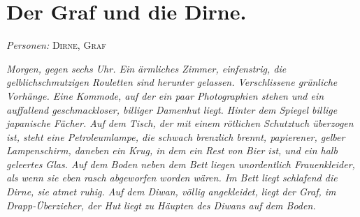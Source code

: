 \documentclass[
	final,
	a4paper,
	ngerman,
	mpinclude = true, %
	twoside = true,
	open = right,
	cleardoublepage = plain,
	DIV = 13,
	BCOR = 1cm,
	titlepage = firstiscover,
	]{scrbook}
\newcommand{\scene}{\section}
\newcommand{\setting}[1]{\vspace{-0.5\baselineskip}\centering\textit{#1}}
\newcommand{\characterlist}[1]{{\begin{center}\textit{Personen:} #1\end{center}}}
\newcommand{\thecharacter}[1]{\textup{\textsc{#1}}\xspace}
\newcommand{\thedirne}{\thecharacter{Dirne}}
\newcommand{\thegraf}{\thecharacter{Graf}}
\begin{document}
\scene{Der Graf und die Dirne.}
\characterlist{\thedirne, \thegraf}
\setting{Morgen, gegen sechs Uhr. Ein ärmliches Zimmer, einfenstrig, die gelblichschmutzigen Rouletten sind herunter gelassen. Verschlissene grünliche Vorhänge. Eine Kommode, auf der ein paar Photographien stehen und ein auffallend geschmackloser, billiger Damenhut liegt. Hinter dem Spiegel billige japanische Fächer. Auf dem Tisch, der mit einem rötlichen Schutztuch überzogen ist, steht eine Petroleumlampe, die schwach brenzlich brennt, papierener, gelber Lampenschirm, daneben ein Krug, in dem ein Rest von Bier ist, und ein halb geleertes Glas. Auf dem Boden neben dem Bett liegen unordentlich Frauenkleider, als wenn sie eben rasch abgeworfen worden wären. Im Bett liegt schlafend die Dirne, sie atmet ruhig. Auf dem Diwan, völlig angekleidet, liegt der Graf, im Drapp-Überzieher, der Hut liegt zu Häupten des Diwans auf dem Boden.}
\end{document}
